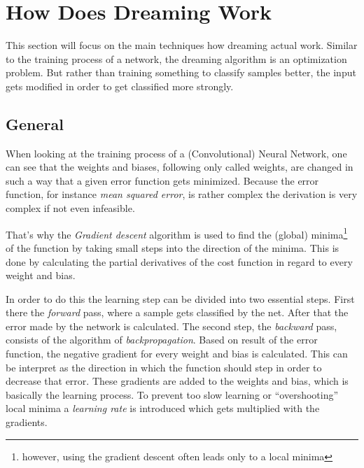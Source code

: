 
\section{How Does Dreaming Work}
\label{sec:how}

This section will focus on the main techniques how dreaming actual work.
Similar to the training process of a network, the dreaming algorithm is an optimization problem.
But rather than training something to classify samples better, the input gets modified in order to get classified more strongly.


\subsection{General}
When looking at the training process of a (Convolutional) Neural Network, one can see that the weights and biases, following only called weights, are changed in such a way that a given error function gets minimized.
Because the error function, for instance \emph{mean squared error}, is rather complex the derivation is very complex if not even infeasible.



That's why the \emph{Gradient descent} algorithm is used to find the (global) minima\footnote{however, using the gradient descent often leads only to a local minima} of the function by taking small steps into the direction of the minima.
This is done by calculating the partial derivatives of the cost function in regard to every weight and bias.

In order to do this the learning step can be divided into two essential steps.
First there the \emph{forward} pass, where a sample gets classified by the net.
After that the error made by the network is calculated.
The second step, the \emph{backward} pass, consists of the algorithm of \emph{backpropagation}.
Based on result of the error function, the negative gradient for every weight and bias is calculated.
This can be interpret as the direction in which the function should step in order to decrease that error.
These gradients are added to the weights and bias, which is basically the learning process.
To prevent too slow learning or \enquote{overshooting} local minima a \emph{learning rate} is introduced which gets multiplied with the gradients.

